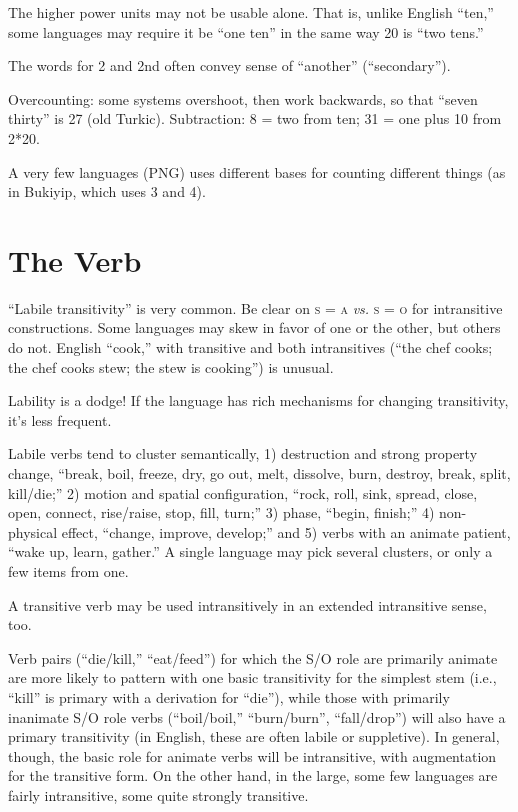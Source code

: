 \documentclass[11pt]{article}
\newcommand{\I}[1]{\textsc{#1}}   %
\begin{document}
The higher power units may not be usable alone. That is, unlike
English ``ten,'' some languages may require it be ``one ten'' in the
same way 20 is ``two tens.''

The words for 2 and 2nd often convey sense of ``another''
(``secondary''). 

Overcounting: some systems overshoot, then work backwards, so that
``seven thirty'' is 27 (old Turkic).  Subtraction: 8 = two from ten;
31 = one plus 10 from 2*20.

A very few languages (PNG) uses different bases for counting different
things (as in Bukiyip, which uses 3 and 4).


\section{The Verb}
``Labile transitivity'' is very common.  Be clear on \I{s = a}
\textit{vs.} \I{s = o} for intransitive constructions.  Some languages
may skew in favor of one or the other, but others do not.  English
``cook,'' with transitive and both intransitives (``the chef cooks;
the chef cooks stew; the stew is cooking'') is unusual.

Lability is a dodge!  If the language has rich mechanisms for changing
transitivity, it's less frequent.

Labile verbs tend to cluster semantically, 1) destruction and strong
property change, ``break, boil, freeze, dry, go out, melt, dissolve,
burn, destroy, break, split, kill/die;'' 2) motion and spatial
configuration, ``rock, roll, sink, spread, close, open, connect,
rise/raise, stop, fill, turn;'' 3) phase, ``begin, finish;'' 4)
non-physical effect, ``change, improve, develop;'' and 5) verbs with
an animate patient, ``wake up, learn, gather.''  A single language may
pick several clusters, or only a few items from one.

A transitive verb may be used intransitively in an extended
intransitive sense, too.

Verb pairs (``die/kill,'' ``eat/feed'') for which the S/O role are
primarily animate are more likely to pattern with one basic
transitivity for the simplest stem (i.e., ``kill'' is primary with a
derivation for ``die''), while those with primarily inanimate S/O role
verbs (``boil/boil,'' ``burn/burn'', ``fall/drop'') will also have a
primary transitivity (in English, these are often labile or
suppletive).  In general, though, the basic role for animate verbs
will be intransitive, with augmentation for the transitive form.  On
the other hand, in the large, some few languages are fairly
intransitive, some quite strongly transitive.
\end{document}
